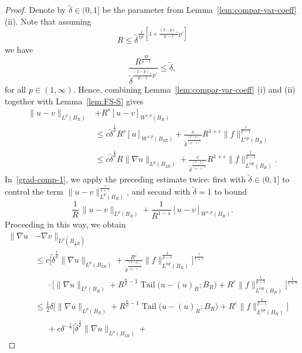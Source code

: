 \documentclass[10pt,letterpaper]{amsart}
\theoremstyle{definition}
\numberwithin{theorem}{section}
\numberwithin{equation}{section}
\newcommand{\1}{\ensuremath{\mathds{1}}}
\renewcommand{\epsilon}{\varepsilon}
\renewcommand{\epsilon}{\varepsilon}
\DeclareMathOperator{\Tail}{Tail}
\numberwithin{equation}{section}
\begin{document}
\begin{proof}
Denote by $\tilde \delta \in (0,1]$ be the parameter from Lemma~\ref{lem:compar-var-coeff} (ii). Note that assuming 
\begin{equation*}%
     R \le \tilde \delta^{\frac{1}{\chi p'}[1 + \frac{(2-p)_+}{p-1} p']}  
\end{equation*}
we have
$$
\frac{R^{\frac{\chi p}{p-1}}}{\tilde\delta^{\frac{(2-p)_+}{p-1}p'}}
    \le 
    \tilde\delta,
$$
for all $p \in (1,\infty)$. Hence, combining Lemma~\ref{lem:compar-var-coeff} (i) and (ii) together with Lemma~\ref{lem:FS-S} gives
\begin{align*}
    \|u-v\|_{L^p(B_{R})} & + R^s[u-v]_{W^{s,p}(B_{R})} \\
    &\le 
    c\tilde\delta^{\frac{1}{p}} R^{s}
     [u]_{W^{s,p}(B_{2R})} + 
     \frac{c}{\tilde\delta^{\frac{(2-p)_+}{(p-1)^2}}} 
     R^{1+\epsilon}
    \|f\|_{L^{\tilde\alpha p}(B_R)}^{\frac{1}{p-1}}\\
    &\le 
    c\tilde\delta^{\frac{1}{p}} R
     \| \nabla u \|_{L^{p}(B_{2R})} + 
     \frac{c}{\tilde\delta^{\frac{(2-p)_+}{(p-1)^2}}} 
     R^{1+\epsilon}
    \|f\|_{L^{\tilde\alpha p}(B_R)}^{\frac{1}{p-1}}.
\end{align*}
In~\eqref{grad-comp-1}, we apply the preceding estimate twice: first with $\tilde\delta\in(0,1]$ to control the term $\|u-v\|_{L^p(B_R)}^{\frac{\gamma}{1+\gamma}}$, and second with $\tilde\delta=1$ to bound 
\[
\frac{1}{R}\,\|u-v\|_{L^p(B_R)} + \frac{1}{R^{1-s}} [u-v]_{W^{s,p}(B_R)}.
\]
Proceeding in this way, we obtain
\begin{align*}
    \|\nabla u &- \nabla v\|_{L^p(B_{\frac12 R})} \\
    &\leq 
    c
    \bigg[\tilde\delta^{\frac{1}{p}} 
     \| \nabla u \|_{L^{p}(B_{2R})} + 
     \frac{R^\epsilon}{\tilde\delta^{\frac{(2-p)_+}{(p-1)^2}}} 
    \|f\|_{L^{\tilde\alpha p}(B_R)}^{\frac{1}{p-1}} \bigg]^{\frac{\gamma}{1+\gamma}} \\
    &\phantom{\le\,}\cdot
    \bigg[ 
    \| \nabla u \|_{L^{p}(B_R)} +  
    R^{\frac{n}{p}-1} \Tail \big(u-(u)_{R}; B_R\big) + 
    R^{\epsilon} \| f \|_{L^{\tilde \alpha p}(B_R)}^\frac{1}{p-1}\bigg]^{\frac{1}{1+\gamma}} \\
    &\le 
    \tfrac12\delta \bigg[ 
    \| \nabla u \|_{L^{p}(B_R)} +  
    R^{\frac{n}{p}-1} \Tail \big(u-(u)_{R}; B_R\big) + 
    R^{\epsilon} \| f \|_{L^{\tilde \alpha p}(B_R)}^\frac{1}{p-1}\bigg] \\
    &\phantom{\le\,} +
    c\delta^{-\frac{1}{\gamma}}
    \bigg[\tilde\delta^{\frac{1}{p}} 
     \| \nabla u \|_{L^{p}(B_{2R})} + 

\end{align*}
\end{proof}
\end{document}
